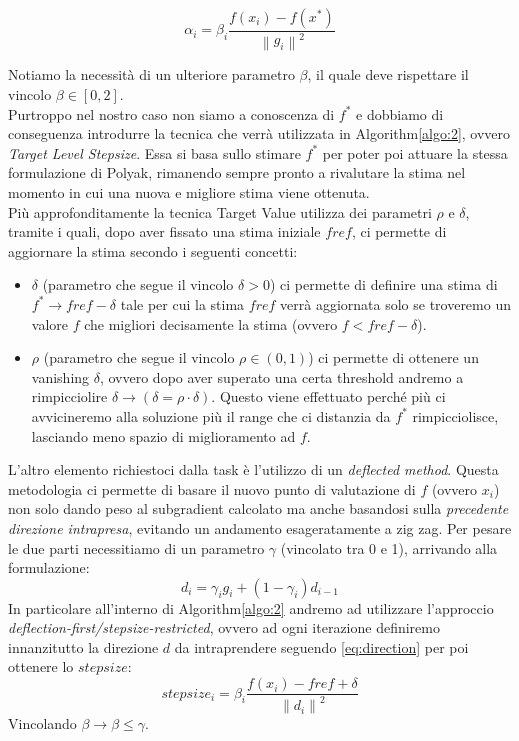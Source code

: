 \documentclass[12pt]{article}
\newcommand{\norm}[1]{\left\lVert#1\right\rVert}
\begin{document}
	\begin{equation}\label{eq:polyak}
		\alpha_i = \beta_i\frac{f(x_i) - f(x^*)}{\norm{g_i}^2}
	\end{equation}

	Notiamo la necessità di un ulteriore parametro $\beta$, il quale deve rispettare il vincolo $\beta \in [0,2]$.\\
	Purtroppo nel nostro caso non siamo a conoscenza di $f^*$ e dobbiamo di conseguenza introdurre la tecnica che verrà utilizzata in Algorithm\ref{algo:2}, ovvero \textit{Target Level Stepsize}. Essa si basa sullo stimare $f^*$ per poter poi attuare la stessa formulazione di  Polyak, rimanendo sempre pronto a rivalutare la stima nel momento in cui una nuova e migliore stima viene ottenuta.\\
	Più approfonditamente la tecnica Target Value utilizza dei parametri $\rho$ e $\delta$, tramite i quali, dopo aver fissato una stima iniziale $fref$, ci permette di aggiornare la stima secondo i seguenti concetti:
	\begin{itemize}
	\item $\delta$ (parametro che segue il vincolo $\delta > 0$) ci permette di definire una stima di $f^*\longrightarrow fref - \delta$ tale per cui la stima $fref$ verrà aggiornata solo se troveremo un valore $f$ che migliori decisamente la stima (ovvero $f < fref - \delta$).
	\item$\rho$ (parametro che segue il vincolo $\rho \in (0,1)$) ci permette di ottenere un vanishing $\delta$, ovvero dopo aver superato una certa threshold andremo a rimpicciolire $\delta \longrightarrow (\delta = \rho \cdot \delta)$. Questo viene effettuato perché più ci avvicineremo alla soluzione più il range che ci distanzia da $f^*$ rimpicciolisce, lasciando meno spazio di miglioramento ad $f$.
	\end{itemize}
	L’altro elemento richiestoci dalla task è l’utilizzo di un \textit{deflected method}. Questa metodologia ci permette di basare il nuovo punto di valutazione di $f$ (ovvero $x_i$) non solo dando peso al subgradient calcolato ma anche basandosi sulla \textit{precedente direzione intrapresa}, evitando un andamento esageratamente a zig zag. Per pesare le due parti necessitiamo di un parametro $\gamma$ (vincolato tra 0 e 1), arrivando alla formulazione: 
	\begin{equation}\label{eq:direction}
		d_i = \gamma_ig_i + (1 - \gamma_i) d_{i-1}
	\end{equation}
	In particolare all’interno di Algorithm\ref{algo:2} andremo ad utilizzare l’approccio \textit{deflection-first/stepsize-restricted}, ovvero ad ogni iterazione definiremo innanzitutto la direzione $d$ da intraprendere seguendo \eqref{eq:direction} per poi ottenere lo $stepsize$:
	\begin{equation}\label{eq:stepsize}
		stepsize_i = \beta_i\frac{f(x_i) - fref + \delta}{\norm{d_i}^2}
	\end{equation}
	Vincolando $\beta \longrightarrow \beta \leq \gamma$.
\end{document}
